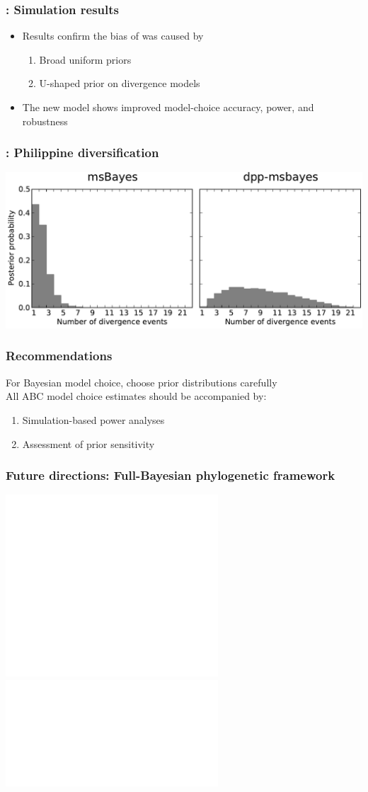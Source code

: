 \begin{frame}
    \frametitle{\dppmsbayes: Simulation results}
    \begin{itemize}
        \item Results confirm the bias of \msb was caused by

        \begin{enumerate}
            \item Broad uniform priors
            \item U-shaped prior on divergence models
        \end{enumerate}

        \item The new model shows improved model-choice accuracy, power, and
            robustness
    \end{itemize}
\end{frame}

\begin{frame}
    \frametitle{\dppmsbayes: Philippine diversification}
    \includegraphics[width=\textwidth]{../../empirical-analyses/plots/philippines-dpp-psi-posterior-old-vs-dpp.pdf}
\end{frame}

\begin{frame}
    \frametitle{Recommendations}
    For Bayesian model choice, choose prior distributions carefully\\
    \bigskip
    All ABC model choice estimates should be accompanied by:
    \begin{enumerate}
        \item Simulation-based power analyses
        \item Assessment of prior sensitivity
    \end{enumerate}
    \medskip
\end{frame}

\begin{frame}
    \frametitle{Future directions: Full-Bayesian phylogenetic framework}
    \includegraphics<1>[height=6.8cm]{../images/sea-level-prediction-trees-labels-compact-alt2.pdf}
    \includegraphics<2>[width=\textwidth]{../images/sea-level-prediction-phylo.pdf}
\end{frame}

